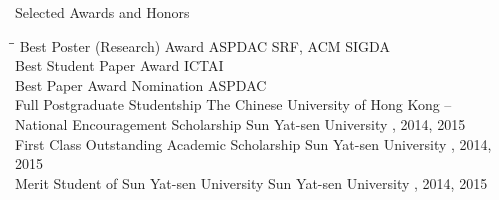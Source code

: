 
\begin{rSection}{Selected Awards and Honors}
\begin{tabbing}
\hspace{3.2in}\= \hspace{2.8in}\=\kill
    Best Poster (Research) Award                 \> ASPDAC SRF, ACM SIGDA        \\

    Best Student Paper Award                     \>ICTAI                         \\   

    Best Paper Award Nomination                  \>ASPDAC                         \\  

    Full Postgraduate Studentship                \>The Chinese University of Hong Kong                       --    \\

    National Encouragement Scholarship      \> Sun Yat-sen University     , 2014, 2015 \\

    First Class Outstanding Academic Scholarship             \> Sun Yat-sen University     , 2014, 2015 \\

    Merit Student of Sun Yat-sen University                   \> Sun Yat-sen University     , 2014, 2015 \\
\end{tabbing}
\end{rSection}

